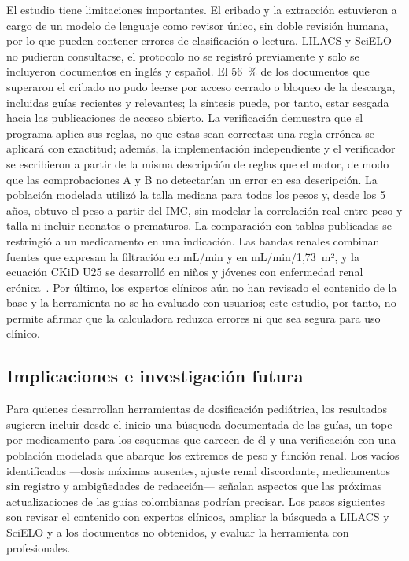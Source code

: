 \documentclass[11pt,a4paper]{article}
\begin{document}
El estudio tiene limitaciones importantes. El cribado y la extracción estuvieron a cargo de un modelo de lenguaje como revisor único, sin doble revisión humana, por lo que pueden contener errores de clasificación o lectura. LILACS y SciELO no pudieron consultarse, el protocolo no se registró previamente y solo se incluyeron documentos en inglés y español. El 56~\% de los documentos que superaron el cribado no pudo leerse por acceso cerrado o bloqueo de la descarga, incluidas guías recientes y relevantes; la síntesis puede, por tanto, estar sesgada hacia las publicaciones de acceso abierto. La verificación demuestra que el programa aplica sus reglas, no que estas sean correctas: una regla errónea se aplicará con exactitud; además, la implementación independiente y el verificador se escribieron a partir de la misma descripción de reglas que el motor, de modo que las comprobaciones A y B no detectarían un error en esa descripción. La población modelada utilizó la talla mediana para todos los pesos y, desde los 5 años, obtuvo el peso a partir del IMC, sin modelar la correlación real entre peso y talla ni incluir neonatos o prematuros. La comparación con tablas publicadas se restringió a un medicamento en una indicación. Las bandas renales combinan fuentes que expresan la filtración en mL/min y en mL/min/1,73~m², y la ecuación CKiD U25 se desarrolló en niños y jóvenes con enfermedad renal crónica~\citep{pierce2021}. Por último, los expertos clínicos aún no han revisado el contenido de la base y la herramienta no se ha evaluado con usuarios; este estudio, por tanto, no permite afirmar que la calculadora reduzca errores ni que sea segura para uso clínico.

\subsection{Implicaciones e investigación futura}

Para quienes desarrollan herramientas de dosificación pediátrica, los resultados sugieren incluir desde el inicio una búsqueda documentada de las guías, un tope por medicamento para los esquemas que carecen de él y una verificación con una población modelada que abarque los extremos de peso y función renal. Los vacíos identificados ---dosis máximas ausentes, ajuste renal discordante, medicamentos sin registro y ambigüedades de redacción--- señalan aspectos que las próximas actualizaciones de las guías colombianas podrían precisar. Los pasos siguientes son revisar el contenido con expertos clínicos, ampliar la búsqueda a LILACS y SciELO y a los documentos no obtenidos, y evaluar la herramienta con profesionales.
\end{document}
